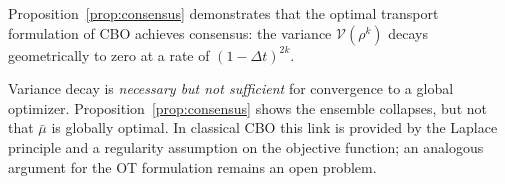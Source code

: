 \documentclass[a4paper, 11pt]{article}
\newcommand{\R}{\mathbb{R}}
\newcommand{\Pw}{\mathcal{P}_{2}\left( \R^{d+2} \right) }
\newcommand{\bmu}{\bar{\mu}}
\theoremstyle{plain} %
\begin{document}
		
	Proposition~\ref{prop:consensus} demonstrates that the optimal transport formulation of CBO achieves consensus: the variance $\mathcal{V}(\rho^k)$ decays geometrically to zero at a rate of $(1-\Delta t)^{2k}$.

	Variance decay is \emph{necessary but not sufficient} for convergence to a global
	optimizer. Proposition~\ref{prop:consensus} shows the ensemble collapses, but not that
	$\bar{\mu}$ is globally optimal. In classical CBO this link is provided by the Laplace
	principle and a regularity assumption on the objective function; an analogous argument for the OT formulation remains an
	open problem.
\end{document}
